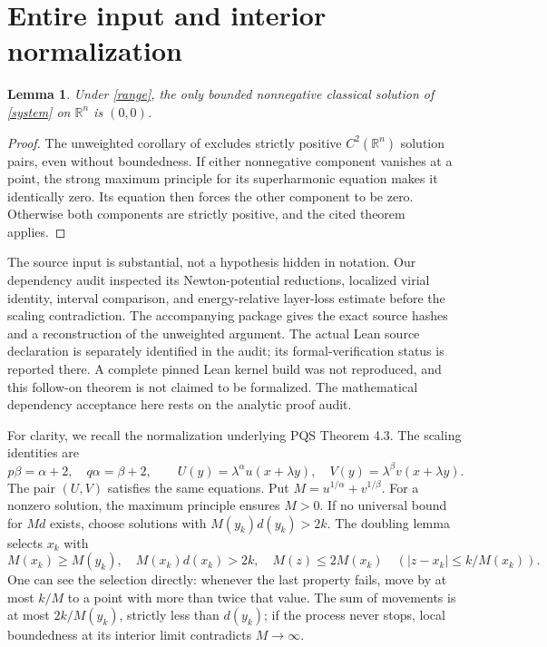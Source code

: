 \documentclass[11pt]{article}
\newcommand{\R}{\mathbb R}
\newtheorem{lemma}[theorem]{Lemma}
\begin{document}
\section{Entire input and interior normalization}
\begin{lemma}\label{entire}
Under \eqref{range}, the only bounded nonnegative classical solution
of \eqref{system} on $\R^n$ is $(0,0)$.
\end{lemma}
\begin{proof}
The unweighted corollary of \cite{OAI} excludes strictly positive
$C^2(\R^n)$ solution pairs, even without boundedness. If either
nonnegative component vanishes at a point, the strong maximum principle
for its superharmonic equation makes it identically zero. Its equation
then forces the other component to be zero. Otherwise both components
are strictly positive, and the cited theorem applies.
\end{proof}

The source input is substantial, not a hypothesis hidden in notation.
Our dependency audit inspected its Newton-potential reductions,
localized virial identity, interval comparison, and energy-relative
layer-loss estimate before the scaling contradiction. The accompanying
package gives the exact source hashes and a reconstruction of the
unweighted argument. The actual Lean source declaration is separately
identified in the audit; its formal-verification status is reported
there. A complete pinned Lean kernel build was not reproduced, and
this follow-on theorem is not claimed to be formalized. The mathematical
dependency acceptance here rests on the analytic proof audit.

For clarity, we recall the normalization underlying PQS Theorem 4.3.
The scaling identities are
\begin{equation}\label{scaling}
 p\beta=\alpha+2,\quad q\alpha=\beta+2,
 \qquad U(y)=\lambda^\alpha u(x+\lambda y),\quad
 V(y)=\lambda^\beta v(x+\lambda y).
\end{equation}
The pair $(U,V)$ satisfies the same equations. Put
$M=u^{1/\alpha}+v^{1/\beta}$. For a nonzero solution, the maximum
principle ensures $M>0$. If no universal bound for $Md$ exists,
choose solutions with $M(y_k)d(y_k)>2k$.
The doubling lemma \cite[Lemma 5.1]{PQS} selects $x_k$ with
\[
 M(x_k)\ge M(y_k),\quad M(x_k)d(x_k)>2k,\quad
 M(z)\le2M(x_k)\quad (|z-x_k|\le k/M(x_k)).
\]
One can see the selection directly: whenever the last property fails,
move by at most $k/M$ to a point with more than twice that value.
The sum of movements is at most $2k/M(y_k)$, strictly less than
$d(y_k)$; if the process never stops, local boundedness at its
interior limit contradicts $M\to\infty$.
\end{document}

